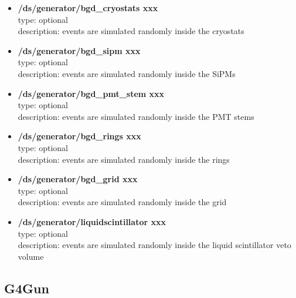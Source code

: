 \documentclass[twocolumn, 10pt]{article}
\begin{document}
\begin{itemize}
\item \textbf{/ds/generator/bgd\_cryostats xxx}\\
type: optional \\
description: events are simulated randomly inside the cryostats

\item \textbf{/ds/generator/bgd\_sipm xxx}\\
type: optional \\
description: events are simulated randomly inside the SiPMs

\item \textbf{/ds/generator/bgd\_pmt\_stem xxx}\\
type: optional \\
description: events are simulated randomly inside the PMT stems

\item \textbf{/ds/generator/bgd\_rings xxx}\\
type: optional \\
description: events are simulated randomly inside the rings


\item \textbf{/ds/generator/bgd\_grid xxx}\\
type: optional \\
description: events are simulated randomly inside the grid

\item \textbf{/ds/generator/liquidscintillator xxx}\\
type: optional \\
description: events are simulated randomly inside the liquid scintillator veto volume






\end{itemize}

\subsection{G4Gun}
\end{document}
